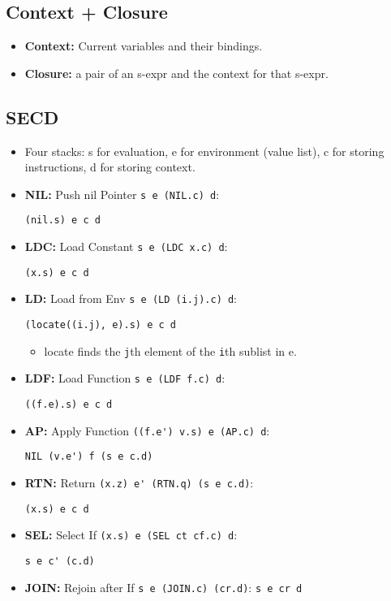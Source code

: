 \documentclass[landscape, letterpaper]{extarticle}
\theoremstyle{definition}
\begin{document}
\begin{multicols}{3}
    \subsection*{Context + Closure}
    \begin{itemize}[noitemsep,nolistsep]
        \item \textbf{Context: } Current variables and their bindings.
        \item \textbf{Closure: } a pair of an s-expr and the context for that s-expr.
    \end{itemize}
    \subsection*{SECD}
    \begin{itemize}[noitemsep,nolistsep]
        \item Four stacks: s for evaluation, e for environment (value list), c for storing instructions, d for storing context.
        \item \textbf{NIL:} Push nil Pointer \verb|s e (NIL.c) d|:
        
        \verb|(nil.s) e c d|
        \item \textbf{LDC:} Load Constant \verb|s e (LDC x.c) d|:
        
        \verb|(x.s) e c d|
        \item \textbf{LD:} Load from Env \verb|s e (LD (i.j).c) d|:

        \verb|(locate((i.j), e).s) e c d|
        \begin{itemize}[noitemsep,nolistsep]
            \item locate finds the \verb|j|th element of the \verb|i|th sublist in e.
        \end{itemize}
        \item \textbf{LDF:} Load Function \verb|s e (LDF f.c) d|:
        
        \verb|((f.e).s) e c d|
        \item \textbf{AP:} Apply Function \verb|((f.e') v.s) e (AP.c) d|:

        \verb|NIL (v.e') f (s e c.d)|
        \item \textbf{RTN:} Return \verb|(x.z) e' (RTN.q) (s e c.d)|:
        
        \verb|(x.s) e c d|
        \item \textbf{SEL:} Select If \verb|(x.s) e (SEL ct cf.c) d|:
        
        \verb|s e c' (c.d)|
        \item \textbf{JOIN:} Rejoin after If \verb|s e (JOIN.c) (cr.d)|: \verb|s e cr d|
    \end{itemize}

\end{multicols}
\end{document}
